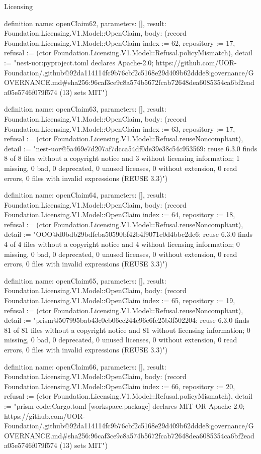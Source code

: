 \begin{lexlean}{Licensing}
\begin{semanticmodule}
definition{
  name: openClaim62,
  parameters: [],
  result: Foundation.Licensing.V1.Model::OpenClaim,
  body: (record Foundation.Licensing.V1.Model::OpenClaim {index := 62, repository := 17, refusal := (ctor Foundation.Licensing.V1.Model::Refusal.policyMismatch), detail := "nest-uor:pyproject.toml declares Apache-2.0; https://github.com/UOR-Foundation/.github@92da114114fc9b76cbf2c5168e29d409b62ddde8:governance/GOVERNANCE.md#sha256:96caf3ce9c8a574b5672fcab72648dea6085354ca6bf2eada05e5746f079f574 (13) sets MIT"})
}

definition{
  name: openClaim63,
  parameters: [],
  result: Foundation.Licensing.V1.Model::OpenClaim,
  body: (record Foundation.Licensing.V1.Model::OpenClaim {index := 63, repository := 17, refusal := (ctor Foundation.Licensing.V1.Model::Refusal.reuseNoncompliant), detail := "nest-uor@5a469e7d207af7dcca54df0de39e38c54c953569: reuse 6.3.0 finds 8 of 8 files without a copyright notice and 3 without licensing information; 1 missing, 0 bad, 0 deprecated, 0 unused licenses, 0 without extension, 0 read errors, 0 files with invalid expressions (REUSE 3.3)"})
}

definition{
  name: openClaim64,
  parameters: [],
  result: Foundation.Licensing.V1.Model::OpenClaim,
  body: (record Foundation.Licensing.V1.Model::OpenClaim {index := 64, repository := 18, refusal := (ctor Foundation.Licensing.V1.Model::Refusal.reuseNoncompliant), detail := "OOO@d0bdb29bdfeba50590bf42b4f9071e0d4bbc2dc6: reuse 6.3.0 finds 4 of 4 files without a copyright notice and 4 without licensing information; 0 missing, 0 bad, 0 deprecated, 0 unused licenses, 0 without extension, 0 read errors, 0 files with invalid expressions (REUSE 3.3)"})
}

definition{
  name: openClaim65,
  parameters: [],
  result: Foundation.Licensing.V1.Model::OpenClaim,
  body: (record Foundation.Licensing.V1.Model::OpenClaim {index := 65, repository := 19, refusal := (ctor Foundation.Licensing.V1.Model::Refusal.reuseNoncompliant), detail := "prism@507995bab43c0cb06ec244c96e6fc25b3f502204: reuse 6.3.0 finds 81 of 81 files without a copyright notice and 81 without licensing information; 0 missing, 0 bad, 0 deprecated, 0 unused licenses, 0 without extension, 0 read errors, 0 files with invalid expressions (REUSE 3.3)"})
}

definition{
  name: openClaim66,
  parameters: [],
  result: Foundation.Licensing.V1.Model::OpenClaim,
  body: (record Foundation.Licensing.V1.Model::OpenClaim {index := 66, repository := 20, refusal := (ctor Foundation.Licensing.V1.Model::Refusal.policyMismatch), detail := "prism-code:Cargo.toml [workspace.package] declares MIT OR Apache-2.0; https://github.com/UOR-Foundation/.github@92da114114fc9b76cbf2c5168e29d409b62ddde8:governance/GOVERNANCE.md#sha256:96caf3ce9c8a574b5672fcab72648dea6085354ca6bf2eada05e5746f079f574 (13) sets MIT"})
}


\end{semanticmodule}
\end{lexlean}
